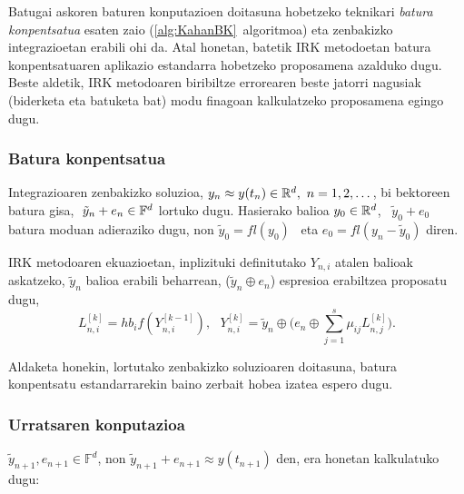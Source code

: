 Batugai askoren baturen konputazioen doitasuna hobetzeko teknikari \emph{batura konpentsatua} esaten zaio (\ref{alg:KahanBK}~algoritmoa) eta zenbakizko integrazioetan erabili ohi da. Atal honetan, batetik IRK metodoetan batura konpentsatuaren aplikazio estandarra hobetzeko proposamena azalduko dugu. Beste aldetik, IRK metodoaren biribiltze errorearen beste jatorri nagusiak (biderketa eta batuketa bat) modu finagoan kalkulatzeko proposamena egingo dugu.    


\subsubsection*{Batura konpentsatua}

Integrazioaren zenbakizko soluzioa, $y_n \approx y(t_n) \in \mathbb{R}^{d}, \ n=1,2,\dots$, bi bektoreen batura gisa, $ \ \tilde{y}_n+e_n \in \mathbb{F}^{d}$ lortuko dugu. Hasierako balioa $y_0 \in \mathbb{R}^{d}$, \ $\tilde{y}_0+e_0$ batura moduan adieraziko dugu, non $\tilde{y}_0=fl(y_0)$~ eta $e_0=fl(y_n-\tilde{y}_0)$ diren. 

IRK metodoaren ekuazioetan, inplizituki definitutako $Y_{n,i}$ atalen balioak askatzeko, $\tilde {y}_n$ balioa erabili beharrean, ($\tilde{y}_n \oplus e_{n}$) espresioa erabiltzea proposatu dugu, 
\begin{equation}
\label{eq:eqbk}
L_{n,i}^{[k]}=hb_if(Y_{n,i}^{[k-1]}), \ \ \ Y_{n,i}^{[k]}=\tilde{y}_n \oplus \big(e_{n} \oplus \sum\limits_{j=1}^{s} \mu_{ij} L_{n,j}^{[k]}\big).
\end{equation}

Aldaketa honekin, lortutako zenbakizko soluzioaren doitasuna, batura konpentsatu estandarrarekin baino zerbait hobea izatea espero dugu. 

\subsubsection*{Urratsaren konputazioa}

$\tilde{y}_{n+1}, e_{n+1} \in \mathbb{F}^d$, non $\tilde{y}_{n+1}+e_{n+1}\approx y(t_{n+1})$ den, era honetan kalkulatuko dugu:


